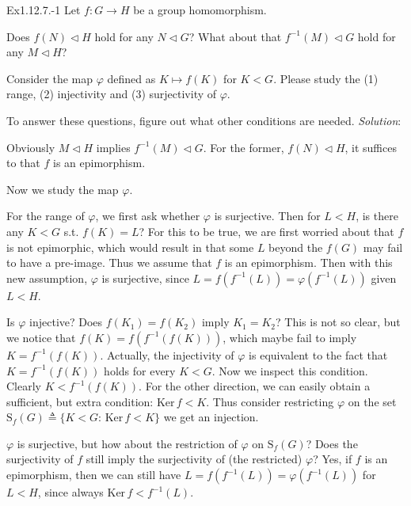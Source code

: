 \documentclass{article}
\newcommand{\nles}{\vartriangleleft}
\newcommand{\Ker}{\text{Ker}\,}
\begin{document}
\begin{Th}{Ex1.12.7.-1}
    Let $f: G\to H$ be a group homomorphism.
    \begin{compactenum}
        \item Does $f(N)\nles H$ hold for any $N\nles G$? What about that $f^{-1}(M) \nles G$ hold for any $M\nles H$?
        \item Consider the map $\varphi$ defined as $K\mapsto f(K)$ for $K<G$. Please study the (1) range, (2) injectivity and (3) surjectivity of $\varphi$.
    \end{compactenum}
    To answer these questions, figure out what other conditions are needed.
    \tcblower
    \textit{Solution}:
    \begin{compactenum}
        \item Obviously $M\nles H$ implies $f^{-1}(M) \nles G$. For the former, $f(N)\nles H$, it suffices to that $f$ is an epimorphism.
        \item Now we study the map $\varphi$.
        \begin{compactenum}
            \item For the range of $\varphi$, we first ask whether $\varphi$ is surjective. Then for $L<H$, is there any $K<G$ s.t. $f(K) = L$? For this to be true, we are first worried about that $f$ is not epimorphic, which would result in that some $L$ beyond the $f(G)$ may fail to have a pre-image. Thus we assume that \textcolor{P}{$f$ is an epimorphism}. Then with this new assumption, $\varphi$ is surjective, since $L = f(f^{-1}(L)) = \varphi(f^{-1}(L))$ given $L<H$.
            \item Is $\varphi$ injective? Does $f(K_1) = f(K_2)$ imply $K_1 = K_2$? This is not so clear, but we notice that $f(K) = f(f^{-1}(f(K)))$, which maybe fail to imply $K = f^{-1}(f(K))$. Actually, the injectivity of $\varphi$ is equivalent to the fact that $K = f^{-1}(f(K))$ holds for every $K < G$. Now we inspect this condition. Clearly $K<f^{-1}(f(K))$. For the other direction, we can easily obtain a sufficient, but extra condition: \textcolor{P}{$\Ker f<K$}. Thus consider restricting $\varphi$ on the set $\mathrm{S}_f(G)\triangleq \{K<G: \,\Ker f<K\}$ we get an injection. 
            \item $\varphi$ is surjective, but how about the restriction of $\varphi$ on $\mathrm{S}_f(G)$? Does the surjectivity of $f$ still imply the surjectivity of (the restricted) $\varphi$? Yes, if $f$ is an epimorphism, then we can still have $L = f(f^{-1}(L)) = \varphi(f^{-1}(L))$ for $L<H$, since always $\Ker f<f^{-1}(L)$.
        \end{compactenum}
    \end{compactenum}
\end{Th}
\end{document}
